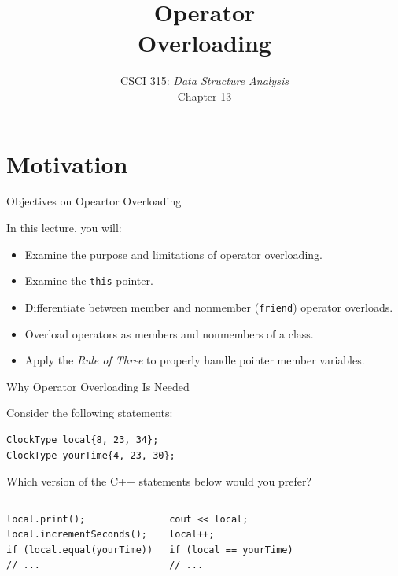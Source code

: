 \documentclass[14pt,aspectratio=1610, hyperref={pdfpagelayout=SinglePage}]{beamer}
\title{\Huge{}Operator\\ Overloading}
\subtitle{CSCI 315: \textit{Data Structure Analysis}\\Chapter 13}
\institute{Charleston Southern University}
\begin{document}
\begin{frame}
  \titlepage%
\end{frame}

\section{Motivation}

\begin{frame}[fragile]{Objectives on Opeartor Overloading}

In this lecture, you will:
\begin{itemize}
\item
  Examine the purpose and limitations of operator overloading.
\item
  Examine the \lstinline{this} pointer.
\item
  Differentiate between member and nonmember (\lstinline{friend}) operator overloads.
\item
  Overload operators as members and nonmembers of a class.
\item
  Apply the \emph{Rule of Three} to properly handle pointer member variables.
\end{itemize}
\end{frame}

\begin{frame}[fragile]{Why Operator Overloading Is Needed}
\protect\hypertarget{why-operator-overloading-is-needed-1-of-2}{}

Consider the following statements:
\begin{lstlisting}
ClockType local{8, 23, 34};
ClockType yourTime{4, 23, 30};
\end{lstlisting}

Which version of the C++ statements below would you prefer?
\begin{columns}[T]
\begin{lstlisting}[basicstyle=\ttfamily\small]
local.print();
local.incrementSeconds();
if (local.equal(yourTime))
// ...
\end{lstlisting}

\begin{lstlisting}[basicstyle=\ttfamily\small, xleftmargin=0pt]
cout << local;
local++;
if (local == yourTime)
// ...
\end{lstlisting}
\end{columns}
\end{frame}
\end{document}
